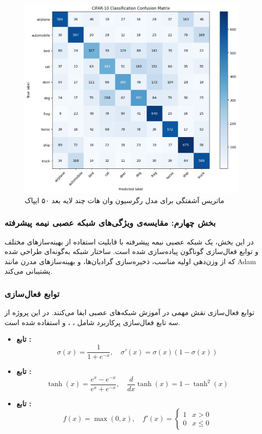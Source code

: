 	\begin{figure}[h]
		\centering
		\includegraphics[width=0.8\linewidth]{images/task3-2}
		\caption{ماتریس آشفتگی برای مدل رگرسیون وان هات چند لایه بعد ۵۰ ایپاک}
		\label{fig:task3-2}
	\end{figure}
	
	
	
	
	
\subsubsection{بخش چهارم: مقایسه‌ی ویژگی‌های شبکه عصبی نیمه پیشرفته}
	
	در این بخش، یک شبکه عصبی نیمه پیشرفته با قابلیت استفاده از بهینه‌سازهای مختلف و توابع فعال‌سازی گوناگون پیاده‌سازی شده است. ساختار شبکه به‌گونه‌ای طراحی شده که از وزن‌دهی اولیه مناسب، ذخیره‌سازی گرادیان‌ها، و بهینه‌سازهای مدرن مانند Adam پشتیبانی می‌کند. 
	
	\subsubsection{توابع فعال‌سازی}
	
	توابع فعال‌سازی نقش مهمی در آموزش شبکه‌های عصبی ایفا می‌کنند. در این پروژه از سه تابع فعال‌سازی پرکاربرد شامل ، ، و  استفاده شده است.
	
	\begin{itemize}
		\item \textbf{تابع :}
		\[
		\sigma(x) = \frac{1}{1 + e^{-x}}, \quad \sigma'(x) = \sigma(x)(1 - \sigma(x))
		\]
		
		\item \textbf{تابع :}
		\[
		\tanh(x) = \frac{e^x - e^{-x}}{e^x + e^{-x}}, \quad \frac{d}{dx} \tanh(x) = 1 - \tanh^2(x)
		\]
		
		\item \textbf{تابع :}
		\[
		f(x) = \max(0, x), \quad f'(x) = \begin{cases}
			1 & x > 0 \\
			0 & x \leq 0
		\end{cases}
		\]
	\end{itemize}

